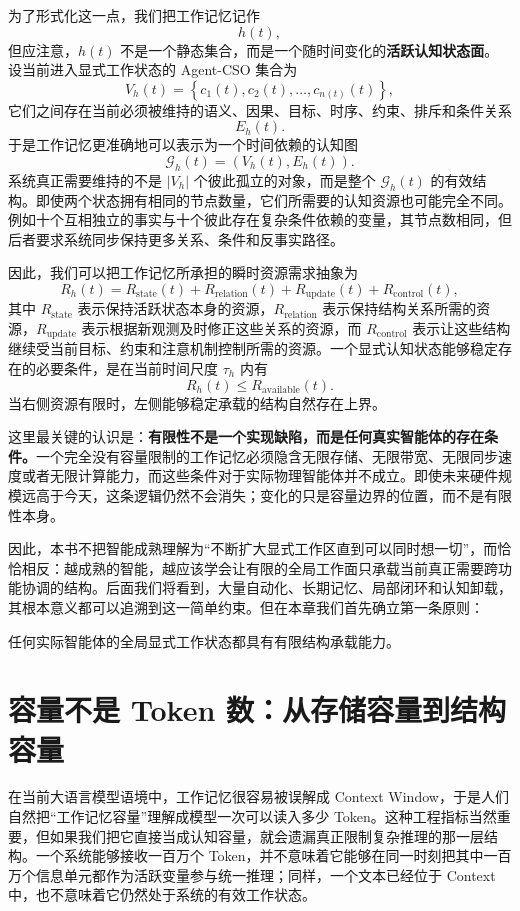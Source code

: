 为了形式化这一点，我们把工作记忆记作
\[
h(t),
\]
但应注意，$h(t)$ 不是一个静态集合，而是一个随时间变化的\textbf{活跃认知状态面}。设当前进入显式工作状态的 Agent-CSO 集合为
\[
V_h(t)=
\left\{
c_1(t),c_2(t),\ldots,c_{n(t)}(t)
\right\},
\]
它们之间存在当前必须被维持的语义、因果、目标、时序、约束、排斥和条件关系
\[
E_h(t).
\]
于是工作记忆更准确地可以表示为一个时间依赖的认知图
\[
\mathcal{G}_h(t)
=
\left(
V_h(t),E_h(t)
\right).
\]
系统真正需要维持的不是 $|V_h|$ 个彼此孤立的对象，而是整个 $\mathcal{G}_h(t)$ 的有效结构。即使两个状态拥有相同的节点数量，它们所需要的认知资源也可能完全不同。例如十个互相独立的事实与十个彼此存在复杂条件依赖的变量，其节点数相同，但后者要求系统同步保持更多关系、条件和反事实路径。

因此，我们可以把工作记忆所承担的瞬时资源需求抽象为
\[
R_h(t)
=
R_{\mathrm{state}}(t)
+
R_{\mathrm{relation}}(t)
+
R_{\mathrm{update}}(t)
+
R_{\mathrm{control}}(t),
\]
其中 $R_{\mathrm{state}}$ 表示保持活跃状态本身的资源，$R_{\mathrm{relation}}$ 表示保持结构关系所需的资源，$R_{\mathrm{update}}$ 表示根据新观测及时修正这些关系的资源，而 $R_{\mathrm{control}}$ 表示让这些结构继续受当前目标、约束和注意机制控制所需的资源。一个显式认知状态能够稳定存在的必要条件，是在当前时间尺度 $\tau_h$ 内有
\[
R_h(t)
\leq
R_{\mathrm{available}}(t).
\]
当右侧资源有限时，左侧能够稳定承载的结构自然存在上界。

这里最关键的认识是：\textbf{有限性不是一个实现缺陷，而是任何真实智能体的存在条件。}一个完全没有容量限制的工作记忆必须隐含无限存储、无限带宽、无限同步速度或者无限计算能力，而这些条件对于实际物理智能体并不成立。即使未来硬件规模远高于今天，这条逻辑仍然不会消失；变化的只是容量边界的位置，而不是有限性本身。

因此，本书不把智能成熟理解为“不断扩大显式工作区直到可以同时想一切”，而恰恰相反：越成熟的智能，越应该学会让有限的全局工作面只承载当前真正需要跨功能协调的结构。后面我们将看到，大量自动化、长期记忆、局部闭环和认知卸载，其根本意义都可以追溯到这一简单约束。但在本章我们首先确立第一条原则：
\begin{proposition*}
任何实际智能体的全局显式工作状态都具有有限结构承载能力。
\end{proposition*}


\section{容量不是 Token 数：从存储容量到结构容量}
\label{sec:wm-not-token-count}

在当前大语言模型语境中，工作记忆很容易被误解成 Context Window，于是人们自然把“工作记忆容量”理解成模型一次可以读入多少 Token。这种工程指标当然重要，但如果我们把它直接当成认知容量，就会遗漏真正限制复杂推理的那一层结构。一个系统能够接收一百万个 Token，并不意味着它能够在同一时刻把其中一百万个信息单元都作为活跃变量参与统一推理；同样，一个文本已经位于 Context 中，也不意味着它仍然处于系统的有效工作状态。

